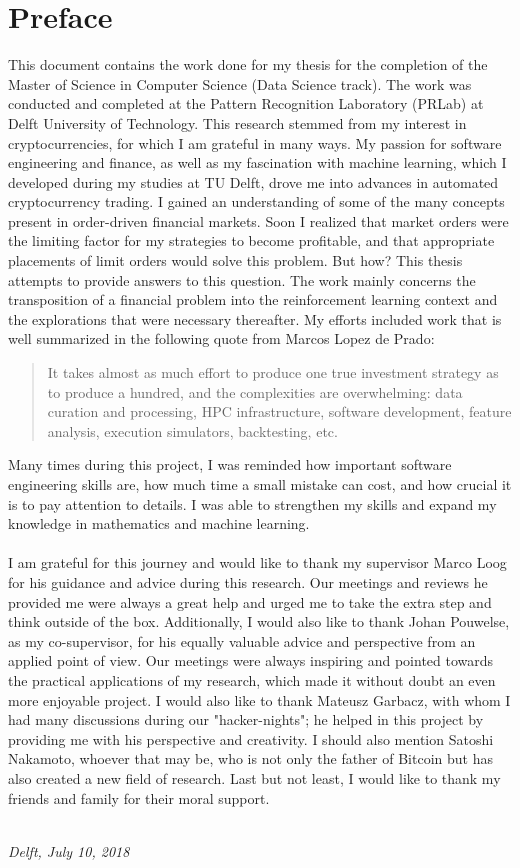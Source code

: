 \chapter*{Preface}
This document contains the work done for my thesis for the completion of the Master of Science in Computer Science (Data Science track). 
The work was conducted and completed at the Pattern Recognition Laboratory (PRLab) at Delft University of Technology.
This research stemmed from my interest in cryptocurrencies, for which I am grateful in many ways.
My passion for software engineering and finance, as well as my fascination with machine learning, which I developed during my studies at TU Delft, drove me into advances in automated cryptocurrency trading.
I gained an understanding of some of the many concepts present in order-driven financial markets.
Soon I realized that market orders were the limiting factor for my strategies to become profitable, and that appropriate placements of limit orders would solve this problem.
But how?
This thesis attempts to provide answers to this question.
The work mainly concerns the transposition of a financial problem into the reinforcement learning context and the explorations that were necessary thereafter.
My efforts included work that is well summarized in the following quote from Marcos Lopez de Prado:
\begin{quote}
    It takes almost as much effort to produce one true investment strategy as to produce a hundred, and the complexities are overwhelming: data curation and processing, HPC infrastructure, software development, feature analysis, execution simulators, backtesting, etc. \cite{de2018advances}
\end{quote}
\noindent
Many times during this project, I was reminded how important software engineering skills are, how much time a small mistake can cost, and how crucial it is to pay attention to details.
I was able to strengthen my skills and expand my knowledge in mathematics and machine learning.
\\
\\
I am grateful for this journey and would like to thank my supervisor Marco Loog for his guidance and advice during this research.
Our meetings and reviews he provided me were always a great help and urged me to take the extra step and think outside of the box.
Additionally, I would also like to thank Johan Pouwelse, as my co-supervisor, for his equally valuable advice and perspective from an applied point of view.
Our meetings were always inspiring and pointed towards the practical applications of my research, which made it without doubt an even more enjoyable project.
I would also like to thank Mateusz Garbacz, with whom I had many discussions during our "hacker-nights"; he helped in this project by providing me with his perspective and creativity.
I should also mention Satoshi Nakamoto, whoever that may be, who is not only the father of Bitcoin but has also created a new field of research.
Last but not least, I would like to thank my friends and family for their moral support.

\begin{flushright}
{\makeatletter\itshape
    \@author \\
    Delft, July 10, 2018
\makeatother}
\end{flushright}

